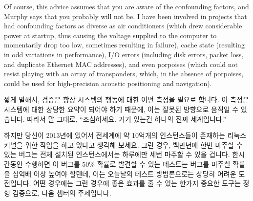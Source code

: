 Of course, this advice assumes that you are aware of the confounding
factors, and Murphy says that you probably will not be.
I have been involved in projects that had confounding factors as
diverse as air conditioners (which drew considerable power at startup,
thus causing the voltage supplied to the computer to momentarily drop
too low, sometimes resulting in failure), cache state (resulting in
odd variations in performance), I/O errors (including disk errors,
packet loss, and duplicate Ethernet MAC addresses), and even
porpoises (which could not resist playing with an array of transponders,
which, in the absence of porpoises, could be
used for high-precision acoustic positioning and navigation).
\fi

짧게 말해서, 검증은 항상 시스템의 행동에 대한 어떤 측정을 필요로 합니다.
이 측정은 시스템에 대한 상당한 요약이 되어야 하기 때문에, 이는 잘못된 방향으로
움직일 수 있습니다.
따라서 말 그대로, ``조심하세요.  거기 있는건 하나의 진짜 세계입니다.''

하지만 당신이 2013년에 있어서 전세계에 약 10억개의 인스턴스들이 존재하는 리눅스
커널을 위한 작업을 하고 있다고 생각해 보세요.
그런 경우, 백만년에 한번 마주할 수 있는 버그는 전체 설치된 인스턴스에서는
하루에만 세번 마주할 수 있을 겁니다.
한시간동안 수행하면 이 버그를 50\% 확률로 발견할 수 있는 테스트는 버그를 마주칠
확률을 십억배 이상 높여야 할텐데, 이는 오늘날의 테스트 방법론으로는 상당히
어려운 도전입니다.
어떤 경우에는 그런 경우에 좋은 효과를 줄 수 있는 한가지 중요한 도구는 정형
검증으로, 다음 챕터의 주제입니다.

